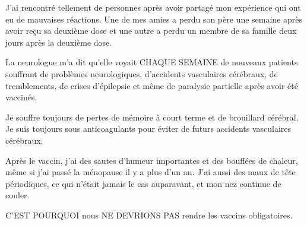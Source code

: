 {J'ai rencontré tellement de personnes après avoir partagé mon expérience qui ont
eu de mauvaises réactions. Une de mes amies a perdu son père une semaine après
avoir reçu sa deuxième dose et une autre a perdu un membre de sa famille deux
jours après la deuxième dose.

La neurologue m'a dit qu'elle voyait CHAQUE SEMAINE de nouveaux patients
souffrant de problèmes neurologiques, d'accidents vasculaires cérébraux, de
tremblements, de crises d'épilepsie et même de paralysie partielle après avoir
été vaccinés.

Je souffre toujours de pertes de mémoire à court terme et de brouillard
cérébral. Je suis toujours sous anticoagulants pour éviter de futurs accidents
vasculaires cérébraux.

Après le vaccin, j'ai des sautes d'humeur importantes et des bouffées de
chaleur, même si j'ai passé la ménopause il y a plus d'un an. J'ai aussi des
maux de tête périodiques, ce qui n'était jamais le cas auparavant, et mon nez
continue de couler.

C'EST POURQUOI nous NE DEVRIONS PAS rendre les vaccins obligatoires.


}
